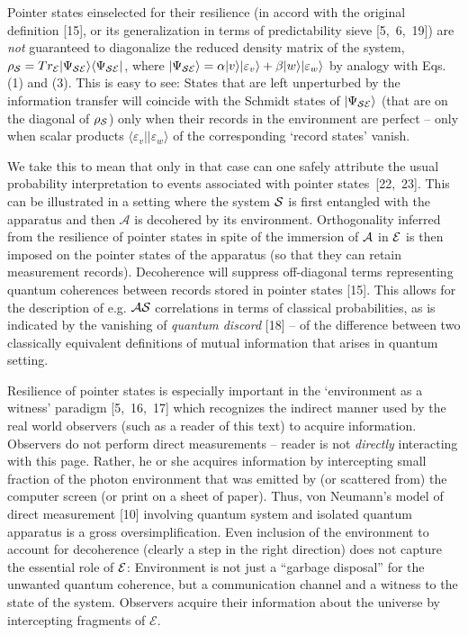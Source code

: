 \documentclass[aps,twocolumn,pra]{revtex4}
\newcommand{\bra}[1]    {\langle #1|}
\newcommand{\ket}[1]    {| #1 \rangle}
\newcommand{\cA}        {{\mathcal A}}
\newcommand{\cE}        {{\mathcal E}}
\newcommand{\+}         {\dagger}
\begin{document}
Pointer states einselected for their resilience (in accord with the original definition [15], or its generalization in terms of predictability sieve [5,~6,~19]) are {\em not} guaranteed to 
diagonalize the reduced density matrix  of the system, $\rho_{\cal S}=Tr_{\cal E} \ket {\Psi_{\cal SE}} \bra {\Psi_{\cal SE}}$, where $\ket {\Psi_{\cal SE}}= \alpha \ket v \ket {\varepsilon_v}+ \beta \ket w \ket {\varepsilon_w}$ by analogy with Eqs. (1) and (3). This is easy to see: States that are left unperturbed by the information transfer will coincide with the Schmidt states of 
$\ket {\Psi_{\cal SE}}$ (that are on the diagonal of  $\rho_{\cal S}$) only when their records in the  environment are perfect -- only when scalar products $\bra {\varepsilon_v} \ket {\varepsilon_w}$ of the corresponding `record states' 
vanish.

We take this to mean that only in that case can one safely attribute the usual probability interpretation to 
events associated with pointer states~[22,~23]. This can be illustrated in a setting where the system 
${\cal S}$ is first entangled with the apparatus and then $\cA$ is decohered by its environment. 
Orthogonality inferred from the resilience of pointer states in spite of the immersion of ${\cal A}$
in ${\cal E}$ is then imposed on the pointer states of the apparatus (so that they can retain measurement records). Decoherence will suppress off-diagonal terms representing quantum coherences between records stored in pointer states [15]. This allows for the description of e.g. ${\cal AS}$ correlations in terms of classical probabilities, as is indicated by the vanishing of {\it quantum discord} [18] -- of the difference between two classically equivalent definitions of mutual information that arises in quantum setting.

Resilience of pointer states is especially important in the `environment as a witness' paradigm [5,~16,~17] which recognizes the indirect manner used by the real world observers 
(such as a reader of this text) to acquire information. Observers do not perform direct 
measurements -- reader is not {\em directly} interacting with this page. Rather, he or she acquires information by intercepting small fraction of the photon environment that was emitted by 
(or scattered from) the computer screen (or print on a sheet of paper). Thus, von Neumann's model of direct measurement [10] involving quantum system and isolated quantum apparatus is a gross oversimplification. Even inclusion of the environment to account for 
decoherence (clearly a step in the right direction) does not capture the essential role of 
${\cal E}$: Environment is not just a ``garbage disposal'' for the unwanted quantum coherence, but a communication channel and a witness to the state of the system. Observers acquire their information about the universe by intercepting fragments of $\cE$.
\end{document}
